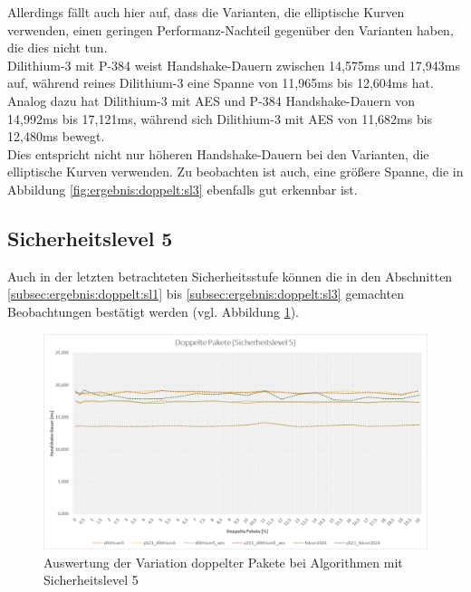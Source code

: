 		Allerdings fällt auch hier auf, dass die Varianten, die elliptische Kurven verwenden, einen geringen Performanz-Nachteil gegenüber den Varianten haben, die dies nicht tun.\\
		
		Dilithium-3 mit P-384 weist Handshake-Dauern zwischen 14,575ms und 17,943ms auf, während reines Dilithium-3 eine Spanne von 11,965ms bis 12,604ms hat. Analog dazu hat Dilithium-3 mit AES und P-384 Handshake-Dauern von 14,992ms bis 17,121ms, während sich Dilithium-3 mit AES von 11,682ms bis 12,480ms bewegt.\\
		
		Dies entspricht nicht nur höheren Handshake-Dauern bei den Varianten, die elliptische Kurven verwenden. Zu beobachten ist auch, eine größere Spanne, die in Abbildung \ref{fig:ergebnis:doppelt:sl3} ebenfalls gut erkennbar ist.
		
		\newpage
		
		\subsection{Sicherheitslevel 5}
		\label{subsec:ergebnis:doppelt:sl5}
		
Auch in der letzten betrachteten Sicherheitsstufe können die in den Abschnitten \ref{subsec:ergebnis:doppelt:sl1} bis \ref{subsec:ergebnis:doppelt:sl3} gemachten Beobachtungen bestätigt werden (vgl. Abbildung \ref{fig:ergebnis:doppelt:sl5}).		
		
		\begin{figure}[htbp]
			\centering
			\includegraphics[width=\textwidth]{../auswertung/doppelt_sl5.png}
			\caption{Auswertung der Variation doppelter Pakete bei Algorithmen mit Sicherheitslevel 5}
			\label{fig:ergebnis:doppelt:sl5}
		\end{figure}
		
